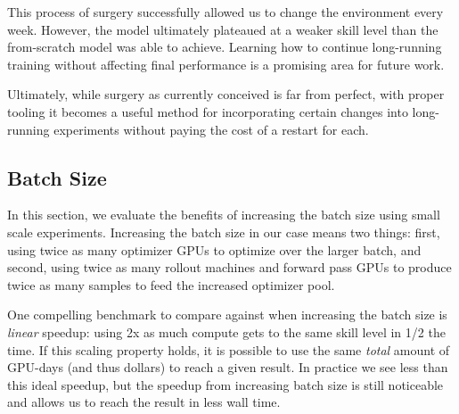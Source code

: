 \documentclass[11pt]{article}
\newcommand{\openaifive}{OpenAI Five\xspace}
\begin{document}
This process of surgery successfully allowed us to change the environment every week. 
However, the model ultimately plateaued at a weaker skill level than the from-scratch model was able to achieve. 
Learning how to continue long-running training without affecting final performance is a promising area for future work.

Ultimately, while surgery as currently conceived is far from perfect, with proper tooling it becomes a useful method for incorporating certain changes into long-running experiments without paying the cost of a restart for each.

\subsection{Batch Size}
In this section, we evaluate the benefits of increasing the batch size using small scale experiments.
Increasing the batch size in our case means two things: first, using twice as many optimizer GPUs to optimize over the larger batch, and second, using twice as many rollout machines and forward pass GPUs to produce twice as many samples to feed the increased optimizer pool.

One compelling benchmark to compare against when increasing the batch size
is {\it linear} speedup: using 2x as much compute gets to the same skill level in 1/2 the time. 
If this scaling property holds, it is possible to use the same {\it total} amount of GPU-days (and thus dollars) to reach a given result\cite{mccandlish2018empirical}.
In practice we see less than this ideal speedup, but the speedup from increasing batch size is still noticeable and allows us to reach the result in less wall time.
\end{document}
